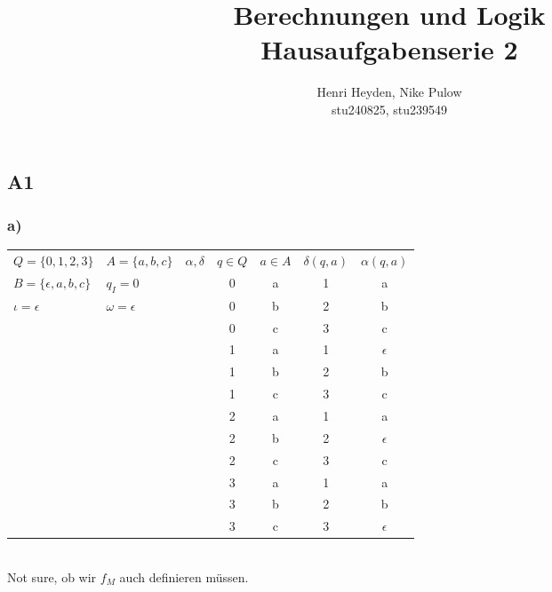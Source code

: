 \documentclass[12pt, a4paper]{article}
\title{Berechnungen und Logik\\Hausaufgabenserie 2}
\author{Henri Heyden, Nike Pulow \\ \small stu240825, stu239549}
\date{}
\begin{document}
\maketitle

\doublespacing

\subsection*{A1}

\subsubsection*{a)}

\begin{tabular}{l l || c c c c c}
    \( Q = \{ 0, 1, 2, 3 \} \) & \(A = \{a, b, c\}\)&\( \alpha, \delta \)&\( q \in Q \) & \( a \in A \) & \( \delta (q, a) \) & \( \alpha(q, a) \) \\ [0.5ex]
    \(B = \{ \epsilon, a, b, c \} \) & \(q_I = 0\) &&0 & a & 1 & a \\
    \( \iota = \epsilon\) & \(\omega = \epsilon\)&&0 & b & 2 & b \\
    &&&0 & c & 3 & c \\
    &&&1 & a & 1 & \(\epsilon\) \\
    &&&1 & b & 2 & b \\
    &&&1 & c & 3 & c \\
    &&&2 & a & 1 & a \\
    &&&2 & b & 2 & \( \epsilon \) \\
    &&&2 & c & 3 & c \\
    &&&3 & a & 1 & a \\
    &&&3 & b & 2 & b \\
    &&&3 & c & 3 & \( \epsilon \)\\[0.5ex]
\end{tabular}\\
Not sure, ob wir \(f_M\) auch definieren müssen. \\
\end{document}
